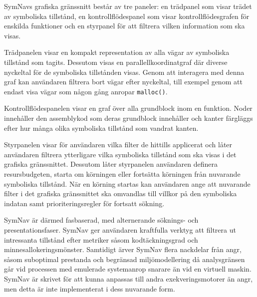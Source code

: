 SymNavs grafiska gränssnitt består av tre paneler: en trädpanel som visar trädet
av symboliska tillstånd, en kontrollflödespanel som visar kontrollflödesgrafen
för enskilda funktioner och en styrpanel för att filtrera vilken information som
ska visas.

Trädpanelen visar en kompakt representation av alla vägar av symboliska
tillstånd som tagits. Dessutom visas en parallellkoordinatgraf där diverse
nyckeltal för de symboliska tillstånden visas. Genom att interagera med denna
graf kan användaren filtrera bort vägar efter nyckeltal, till exempel genom att
endast visa vägar som någon gång anropar \verb|malloc()|.

Kontrollflödespanelen visar en graf över alla grundblock inom en funktion. Noder
innehåller den assemblykod som deras grundblock innehåller och kanter färgläggs
efter hur många olika symboliska tillstånd som vandrat kanten.

Styrpanelen visar för användaren vilka filter de hittills applicerat och låter
användaren filtrera ytterligare vilka symboliska tillstånd som ska visas i det
grafiska gränssnittet. Dessutom låter styrpanelen användaren definera
resursbudgeten, starta om körningen eller fortsätta körningen från nuvarande
symboliska tillstånd. När en körning startas kan användaren ange att nuvarande
filter i det grafiska gränssnittet ska omvandlas till villkor på den symboliska
indatan samt prioriteringsregler för fortsatt sökning.

SymNav är därmed fasbaserad, med alternerande söknings- och presentationsfaser.
SymNav ger användaren kraftfulla verktyg att filtrera ut intressanta tillstånd
efter metriker såsom kodtäckningsgrad och minnesallokeringsmönster. Samtidigt
ärver SymNav flera nackdelar från angr, såsom suboptimal prestanda
\cite{systematic_comparison_symbex} och begränsad miljömodellering då
analysgränsen går vid processen med emulerade systemanrop snarare än vid en
virtuell maskin. SymNav är skrivet för att kunna anpassas till andra
exekveringsmotorer än angr, men detta är inte implementerat i dess nuvarande
form.
